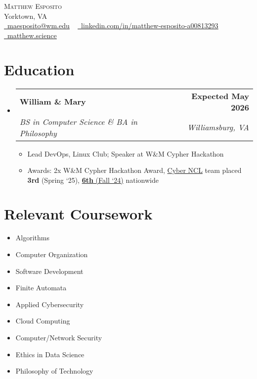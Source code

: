 \documentclass[letterpaper, 11pt]{article}
\makeatletter
\newcommand{\resumeItem}[1]{ \item\small{ {#1 \vspace{-2pt}} } }
\newcommand{\resumeSubheading}[4]{
\vspace{-2pt}
\item
\begin{tabular*}{1.0\textwidth}[t]{l@{\extracolsep{\fill}}r}
	\textbf{#1}       & \textbf{\small #2} \\
	\textit{\small#3} & \textit{\small #4} \\
\end{tabular*}
\vspace{-8pt}
}
\newcommand{\resumeSubHeadingListStart}{\begin{itemize}[leftmargin=0.0in, label={}]}
\newcommand{\resumeSubHeadingListEnd}{\end{itemize}}
\newcommand{\resumeItemListStart}{\vspace{-6pt}\begin{itemize}}
\newcommand{\resumeItemListEnd}{\end{itemize}
\vspace{-6pt}}
\makeatother
\begin{document}
	\begin{center}
		{\Huge \scshape Matthew Esposito} \\
		\vspace{1pt}
		Yorktown, VA \\
		\vspace{1pt}
		\href{mailto:maesposito@wm.edu}{\raisebox{-0.2\height}{\faEnvelope}\ \underline{maesposito@wm.edu}}
		~
		\href{https://linkedin.com/in/matthew-esposito-a00813293/}{\raisebox{-0.2\height}{\faLinkedin}\ \underline{linkedin.com/in/matthew-esposito-a00813293}}
        ~
        \href{https://matthew.science/}{\raisebox{-0.2\height}{\faGlobe}\ \underline{matthew.science}}
		\vspace{-8pt}
	\end{center}

	\section{Education}
	\resumeSubHeadingListStart \resumeSubheading {William \& Mary}{Expected May 2026}
	{BS in Computer Science \& BA in Philosophy}{Williamsburg, VA}
	\resumeItemListStart \resumeItem{Lead DevOps, Linux Club; Speaker at W\&M Cypher Hackathon}
	\resumeItem{Awards: 2x W\&M Cypher Hackathon Award, \href{https://nationalcyberleague.org/competition}{Cyber NCL} team placed \textbf{3rd} (Spring `25), \href{https://www.wm.edu/as/computerscience/about-contactus/news/william-mary-cyber-teams-close-out-2024-ranked-6th-in-the-nation.php}{\textbf{6th} (Fall `24)} nationwide}
	\resumeItemListEnd \resumeSubHeadingListEnd

	\section{Relevant Coursework}
	\begin{multicols}{4}
		{\small \begin{itemize}[itemsep=-5pt, parsep=3pt]\item Algorithms

		\item Computer Organization

		\item Software Development

		\item Finite Automata

		\item Applied Cybersecurity

		\item Cloud Computing

		\item Computer/Network Security

		\item Ethics in Data Science

		\item Philosophy of Technology\end{itemize} }
	\end{multicols}
	\vspace*{2.0\multicolsep}
\end{document}
